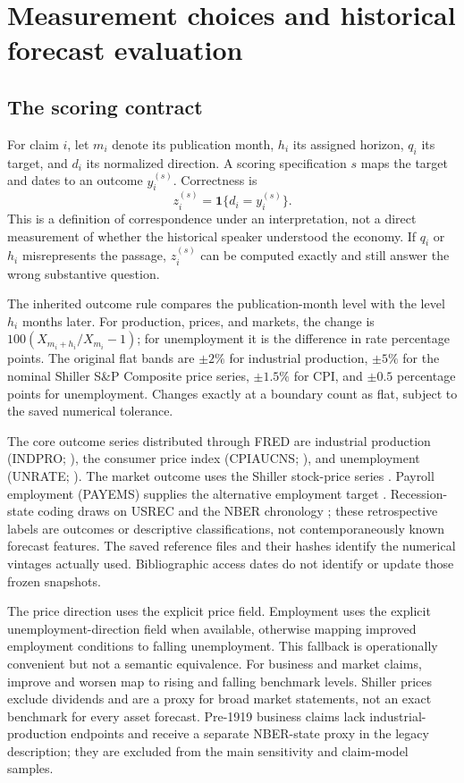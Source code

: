 \section{Measurement choices and historical forecast evaluation}
\subsection{The scoring contract}
For claim $i$, let $m_i$ denote its publication month, $h_i$ its assigned horizon, $q_i$ its target, and $d_i$ its normalized direction. A scoring specification $s$ maps the target and dates to an outcome $y_i^{(s)}$. Correctness is
\begin{equation}
 z_i^{(s)}=\mathbf{1}\{d_i=y_i^{(s)}\}.
 \label{eq:correct}
\end{equation}
This is a definition of correspondence under an interpretation, not a direct measurement of whether the historical speaker understood the economy. If $q_i$ or $h_i$ misrepresents the passage, $z_i^{(s)}$ can be computed exactly and still answer the wrong substantive question.

The inherited outcome rule compares the publication-month level with the level $h_i$ months later. For production, prices, and markets, the change is $100(X_{m_i+h_i}/X_{m_i}-1)$; for unemployment it is the difference in rate percentage points. The original flat bands are $\pm2\%$ for industrial production, $\pm5\%$ for the nominal Shiller S\&P Composite price series, $\pm1.5\%$ for CPI, and $\pm0.5$ percentage points for unemployment. Changes exactly at a boundary count as flat, subject to the saved numerical tolerance.

The core outcome series distributed through FRED are industrial production (INDPRO; \citealp{fredindpro}), the consumer price index (CPIAUCNS; \citealp{fredcpi}), and unemployment (UNRATE; \citealp{fredunrate}). The market outcome uses the Shiller stock-price series \citep{shiller}. Payroll employment (PAYEMS) supplies the alternative employment target \citep{fredpayems}. Recession-state coding draws on USREC and the NBER chronology \citep{fredusrec,nber}; these retrospective labels are outcomes or descriptive classifications, not contemporaneously known forecast features. The saved reference files and their hashes identify the numerical vintages actually used. Bibliographic access dates do not identify or update those frozen snapshots.

The price direction uses the explicit price field. Employment uses the explicit unemployment-direction field when available, otherwise mapping improved employment conditions to falling unemployment. This fallback is operationally convenient but not a semantic equivalence. For business and market claims, improve and worsen map to rising and falling benchmark levels. Shiller prices exclude dividends and are a proxy for broad market statements, not an exact benchmark for every asset forecast. Pre-1919 business claims lack industrial-production endpoints and receive a separate NBER-state proxy in the legacy description; they are excluded from the main sensitivity and claim-model samples.

